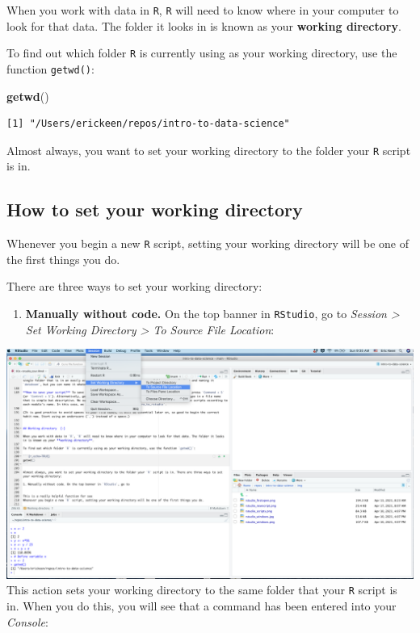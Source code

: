 \documentclass[
]{book}
\newenvironment{Shaded}{\begin{snugshade}}{\end{snugshade}}
\newcommand{\KeywordTok}[1]{\textcolor[rgb]{0.13,0.29,0.53}{\textbf{#1}}}
\newcommand{\NormalTok}[1]{#1}
\providecommand{\tightlist}{%
  \setlength{\itemsep}{0pt}\setlength{\parskip}{0pt}}
\begin{document}
When you work with data in \texttt{R}, \texttt{R} will need to know where in your computer to look for that data. The folder it looks in is known as your \textbf{working directory}.

To find out which folder \texttt{R} is currently using as your working directory, use the function \texttt{getwd()}:

\begin{Shaded}
\begin{Highlighting}[]
\KeywordTok{getwd}\NormalTok{()}
\end{Highlighting}
\end{Shaded}

\begin{verbatim}
[1] "/Users/erickeen/repos/intro-to-data-science"
\end{verbatim}

Almost always, you want to set your working directory to the folder your \texttt{R} script is in.

\hypertarget{how-to-set-your-working-directory}{%
\subsection*{How to set your working directory}\label{how-to-set-your-working-directory}}

Whenever you begin a new \texttt{R} script, setting your working directory will be one of the first things you do.

There are three ways to set your working directory:

\begin{enumerate}
\def\labelenumi{\arabic{enumi}.}
\tightlist
\item
  \textbf{Manually without code.} On the top banner in \texttt{RStudio}, go to \emph{Session \textgreater{} Set Working Directory \textgreater{} To Source File Location}:
\end{enumerate}

\includegraphics{img/rstudio_setwd.png}
This action sets your working directory to the same folder that your \texttt{R} script is in. When you do this, you will see that a command has been entered into your \emph{Console}:
\end{document}
